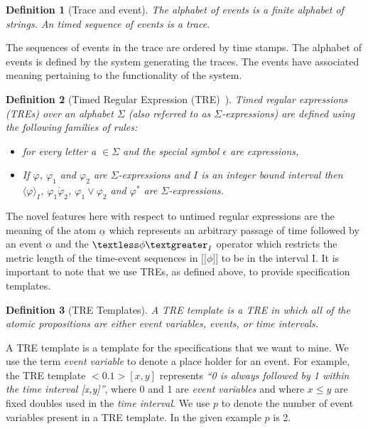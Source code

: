 \documentclass[]{sigplanconf}
\begin{document}
\newtheorem{defns}{Definition}

\begin{defns}[Trace and event]
The alphabet of events is a finite alphabet of strings. An timed sequence of events is a trace.
\end{defns}

The sequences of events in the trace are ordered by time stamps.
The alphabet of events is defined by the system generating the traces. The events have associated meaning pertaining to the functionality of the system.


\begin{defns}[Timed Regular Expression (TRE)~\cite{timedregex}]
Timed regular expressions (TREs) over an alphabet $\Sigma$ (also referred to as $\Sigma$-expressions) are defined using the following families of rules:
\begin{itemize}
  \item  {} for every letter a $\in \Sigma$ and the special symbol $\epsilon$ are expressions,
  \item If $\varphi$, $\varphi_1$ and $\varphi_2$ are $\Sigma$-expressions and $I$ is an integer bound interval then $\langle \varphi \rangle_I$, $\varphi_1 \dot \varphi_2$, $\varphi_1 \vee \varphi_2$ and $\varphi^*$ are $\Sigma$-expressions.
\end{itemize}
\end{defns}

The novel features here with respect to untimed regular expressions are the meaning of the atom $\underline{\alpha}$ which represents an arbitrary passage of time followed by an event $\alpha$ and the $\textless \phi \textgreater _I$ operator which restricts the metric length of the time-event sequences in [[$\phi$]] to be in the interval I. It is important to note that we use TREs, as defined above, to provide specification templates.


\begin{defns}[TRE Templates]
A TRE template is a TRE in which all of the atomic propositions are either event variables, events, or time intervals.
\end{defns}

A TRE template is a template for the specifications that we want to mine. We use the term \emph{event variable} to denote a place holder for an event. For example, the TRE template $<0.1>[x,y]$ represents \emph{``0 is always followed by 1 within the time interval [x,y]''}, where 0 and 1 are \emph{event variables} and where $x \le y$ are fixed doubles used in the \emph{time interval}. We use $p$ to denote the number of event variables present in a TRE template. In the given example $p$ is 2.
\end{document}

